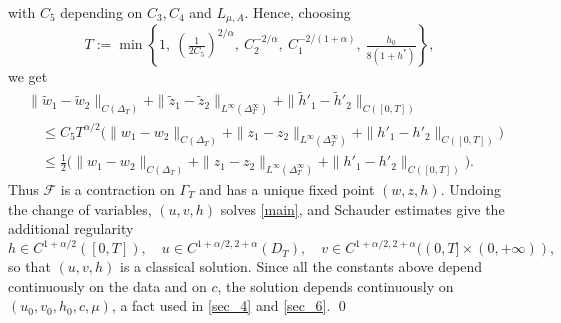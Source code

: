 \documentclass[reqno]{amsart}
\theoremstyle{plain}
\theoremstyle{definition}
\theoremstyle{remark}
\begin{document}
with $C_5$ depending on $C_3, C_4$ and $L_{\mu,A}$. Hence, choosing
\[
T := \min \left\{ 1, \ \left(\tfrac{1}{2C_5}\right)^{2/\alpha}, \ C_2^{-2/\alpha}, \ C_1^{-2/(1+\alpha)}, \ \tfrac{h_0}{8(1+h^*)} \right\},
\]
we get
\[
\begin{aligned}
	& \|\tilde{w}_1 - \tilde{w}_2\|_{C(\Delta_T)} + \|\tilde{z}_1 - \tilde{z}_2\|_{L^\infty(\Delta_T^\infty)} + \|\tilde{h}'_1 - \tilde{h}'_2\|_{C([0,T])}\\
	&\quad \le C_5 T^{\alpha/2} \big(\|w_1 - w_2\|_{C(\Delta_T)} + \|z_1 - z_2\|_{L^\infty(\Delta_T^\infty)} + \|h'_1 - h'_2\|_{C([0,T])}\big) \\
	&\quad \le \tfrac{1}{2} \big(\|w_1 - w_2\|_{C(\Delta_T)} + \|z_1 - z_2\|_{L^\infty(\Delta_T^\infty)} + \|h'_1 - h'_2\|_{C([0,T])}\big).
\end{aligned}
\]
Thus $\mathcal F$ is a contraction on $\Gamma_T$ and has a unique fixed point
$(w,z,h)$. Undoing the change of variables, $(u,v,h)$ solves \eqref{main}, and
Schauder estimates give the additional regularity
\[
h \in C^{1+\alpha/2}([0,T]), \quad u \in C^{1+\alpha/2, 2+\alpha}(D_T), \quad v \in C^{1+\alpha/2, 2+\alpha}((0,T] \times (0, +\infty)),
\]
so that $(u,v,h)$ is a classical solution. Since all the constants above depend
continuously on the data and on $c$, the solution depends continuously on
$(u_0,v_0,h_0,c,\mu)$, a fact used in \cref{sec_4} and \cref{sec_6}. \qed

%
%
%
%



\end{document}

